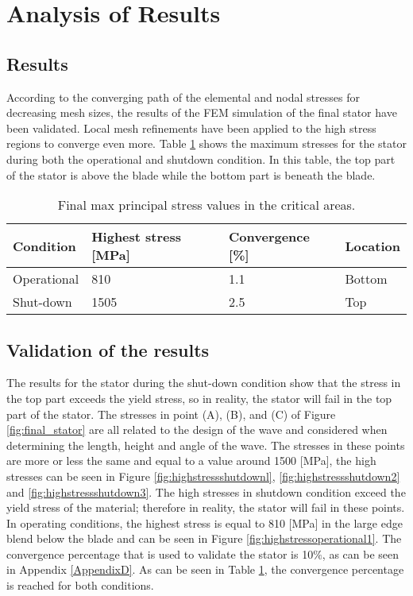 \section{Analysis of Results}
\label{Results}
\subsection{Results}
According to the converging path of the elemental and nodal stresses for decreasing mesh sizes, the results of the FEM simulation of the final stator have been validated. Local mesh refinements have been applied to the high stress regions to converge even more. Table \ref{tab:final_stresses} shows the maximum stresses for the stator during both the operational and shutdown condition. In this table, the top part of the stator is above the blade while the bottom part is beneath the blade.
\begin{table}[H]
\centering
\caption{Final max principal stress values in the critical areas.}
\label{tab:final_stresses}
\begin{tabular}{|l|l|l|l|}
\hline
\textbf{Condition} & \textbf{Highest stress} [MPa] & \textbf{Convergence [\%]} & \textbf{Location} \\ \hline
Operational        & 810             & 1.1			& Bottom             \\ \hline
Shut-down          & 1505            & 2.5			& Top                \\ \hline
\end{tabular}
\end{table}
\subsection{Validation of the results}
The results for the stator during the shut-down condition show that the stress in the top part exceeds the yield stress, so in reality, the stator will fail in the top part of the stator. The stresses in point (A), (B), and (C) of Figure \ref{fig:final_stator} are all related to the design of the wave and considered when determining the length, height and angle of the wave. The stresses in these points are more or less the same and equal to a value around 1500 [MPa], the high stresses can be seen in Figure \ref{fig:highstressshutdownl}, \ref{fig:highstressshutdown2} and \ref{fig:highstressshutdown3}. The high stresses in shutdown condition exceed the yield stress of the material; therefore in reality, the stator will fail in these points.\\
In operating conditions, the highest stress is equal to 810 [MPa] in the large edge blend below the blade and can be seen in Figure \ref{fig:highstressoperational1}. The convergence percentage that is used to validate the stator is 10$\%$, as can be seen in Appendix \ref{AppendixD}. As can be seen in Table \ref{tab:final_stresses}, the convergence percentage is reached for both conditions. 


